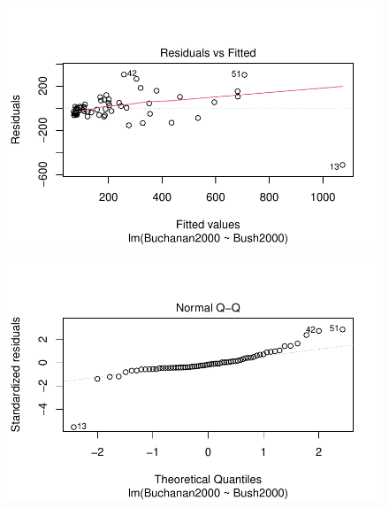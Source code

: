 \documentclass[
  letterpaper,
  DIV=11,
  numbers=noendperiod]{scrartcl}
\begin{document}
\begin{figure}[H]

{\centering \includegraphics{case_study_1_files/figure-pdf/unnamed-chunk-2-1.pdf}

}

\end{figure}

\begin{figure}[H]

{\centering \includegraphics{case_study_1_files/figure-pdf/unnamed-chunk-2-2.pdf}

}

\end{figure}
\end{document}
